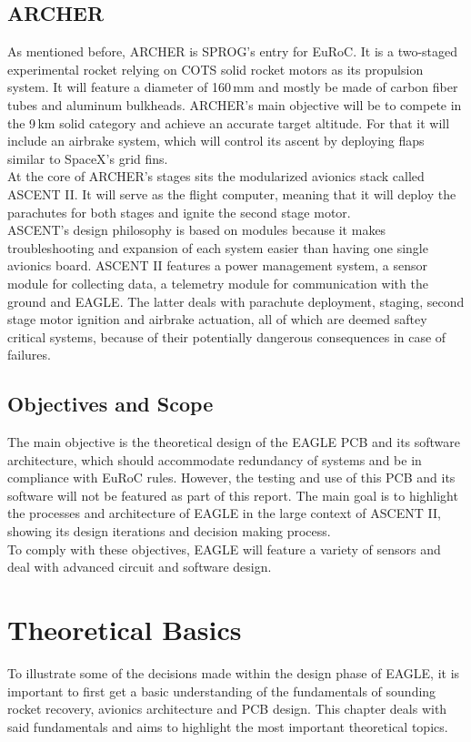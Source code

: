 \documentclass[fontsize=11pt,%
twoside,%
BCOR          = 8mm, %
DIV           = 11,  %
titlepage     = off,%
index=totoc,%
xcolor        = pdftex,%
dvipsnames,%
bibliography  = totoc,%
bibliography = numbered, %
listof        = notnumbered]{scrreprt}
\begin{document}
\section{ARCHER}
As mentioned before, ARCHER is SPROG's entry for EuRoC. It is a two-staged experimental rocket relying on COTS solid rocket motors as its propulsion system. It will feature a diameter of 160\,mm and mostly be made of carbon fiber tubes and aluminum bulkheads. ARCHER's main objective will be to compete in the 9\,km solid category and achieve an accurate target altitude. For that it will include an airbrake system, which will control its ascent by deploying flaps similar to SpaceX's grid fins.\\
At the core of ARCHER's stages sits the modularized avionics stack called ASCENT II. It will serve as the flight computer, meaning that it will deploy the parachutes for both stages and ignite the second stage motor.\\
ASCENT's design philosophy is based on modules because it makes troubleshooting and expansion of each system easier than having one single avionics board. ASCENT II features a power management system, a sensor module for collecting data, a telemetry module for communication with the ground and EAGLE. The latter deals with parachute deployment, staging, second stage motor ignition and airbrake actuation, all of which are deemed saftey critical systems, because of their potentially dangerous consequences in case of failures.\\

\section{Objectives and Scope}
The main objective is the theoretical design of the EAGLE PCB and its software architecture, which should accommodate redundancy of systems and be in compliance with EuRoC rules. However, the testing and use of this PCB and its software will not be featured as part of this report. The main goal is to highlight the processes and architecture of EAGLE in the large context of ASCENT II, showing its design iterations and decision making process.\\
To comply with these objectives, EAGLE will feature a variety of sensors and deal with advanced circuit and software design.

\newpage


\chapter{Theoretical Basics}
To illustrate some of the decisions made within the design phase of EAGLE, it is important to first get a basic understanding of the fundamentals of sounding rocket recovery, avionics architecture and PCB design. This chapter deals with said fundamentals and aims to highlight the most important theoretical topics.
\end{document}
